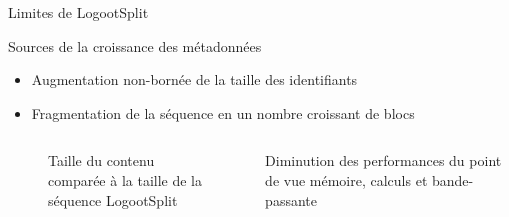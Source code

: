 \begin{frame}{Limites de LogootSplit}
    \begin{block}{Sources de la croissance des métadonnées}
        \begin{itemize}
            \item Augmentation non-bornée de la taille des identifiants
            \item Fragmentation de la séquence en un nombre croissant de blocs
        \end{itemize}
    \end{block}
    \vspace{-1.5em}
    \begin{columns}
        \begin{column}{0.6\textwidth}
            \begin{figure}
                \caption{Taille du contenu comparée à la taille de la séquence LogootSplit}
            \end{figure}
        \end{column}
        \begin{column}{0.4\textwidth}
            \vspace{-2em}
            \begin{center}
                Diminution des performances du point de vue \alert{mémoire, calculs et bande-passante}
            \end{center}
        \end{column}
    \end{columns}
\end{frame}

